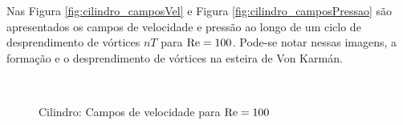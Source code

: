 Nas Figura \ref{fig:cilindro_camposVel} e Figura \ref{fig:cilindro_camposPressao} são apresentados os campos de velocidade e pressão ao longo de um ciclo de desprendimento de vórtices $nT$ para $\mathrm{Re} = 100$. Pode-se notar nessas imagens, a formação e o desprendimento de vórtices na esteira de Von Karmán.

\begin{figure}[!htbp]
	\caption{Cilindro: Campos de velocidade para $\mathrm{Re} = 100$}
	\centering
	 \
	 \\

\end{figure}
